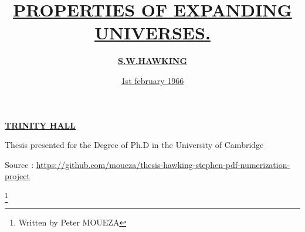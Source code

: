\documentclass{article}
\title{\underline{\textbf{PROPERTIES OF EXPANDING UNIVERSES.}}}
\date{\underline{1st february 1966}}
\begin{document}

\maketitle

\begin{center}
\author{\underline{\textbf{S.W.HAWKING}}}


\underline{\textbf{TRINITY HALL}}


Thesis presented for the Degree of Ph.D in the University of Cambridge

\end{center}









Source : \url{https://github.com/moueza/thesis-hawking-stephen-pdf-numerization-project}

\footnote{Written by Peter MOUEZA}
\end{document}
